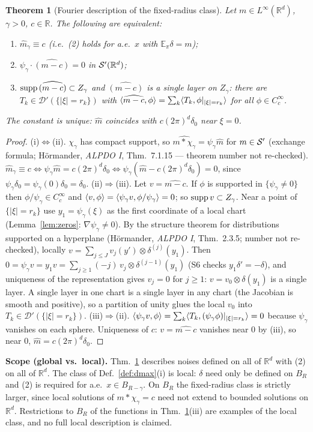 \documentclass[11pt,a4paper]{article}
\numberwithin{equation}{section}
\newtheorem{theorem}{Theorem}[section]
\theoremstyle{definition}
\theoremstyle{remark}
\newcommand{\E}{\mathbb E}\newcommand{\R}{\mathbb R}\newcommand{\N}{\mathbb N}\newcommand{\Prob}{\mathbb P}
\begin{document}
\begin{theorem}[Fourier description of the fixed-radius class]\label{thm:fourier}
Let $m\in L^\infty(\R^d)$, $\gamma>0$, $c\in\R$. The following are equivalent:
\begin{enumerate}[label=(\roman*)]
\item $\hat m_\gamma\equiv c$ (i.e.\ (2) holds for a.e.\ $x$ with $\E_\pi\delta=m$);
\item $\psi_\gamma\cdot\widehat{(m-c)}=0$ in $\cS'(\R^d)$;
\item $\operatorname{supp}\widehat{(m-c)}\subset Z_\gamma$ and $\widehat{(m-c)}$ is a single layer on $Z_\gamma$: there are $T_k\in\mathcal D'(\{|\xi|=r_k\})$ with $\langle \widehat{m-c},\phi\rangle=\sum_k\langle T_k,\phi|_{|\xi|=r_k}\rangle$ for all $\phi\in C_c^\infty$.
\end{enumerate}
The constant is unique: $\hat m$ coincides with $c(2\pi)^d\delta_0$ near $\xi=0$.
\end{theorem}
\begin{proof}
(i)$\iff$(ii). $\chi_\gamma$ has compact support, so $\widehat{m*\chi_\gamma}=\psi_\gamma\hat m$ for $m\in\mathcal S'$ (exchange formula; Hörmander, \emph{ALPDO I}, Thm.~7.1.15 --- theorem number not re-checked). $\hat m_\gamma\equiv c\iff\psi_\gamma\hat m=c(2\pi)^d\delta_0\iff\psi_\gamma(\hat m-c(2\pi)^d\delta_0)=0$, since $\psi_\gamma\delta_0=\psi_\gamma(0)\delta_0=\delta_0$.
(ii)$\Rightarrow$(iii). Let $v=\widehat{m-c}$. If $\phi$ is supported in $\{\psi_\gamma\ne0\}$ then $\phi/\psi_\gamma\in C_c^\infty$ and $\langle v,\phi\rangle=\langle \psi_\gamma v,\phi/\psi_\gamma\rangle=0$; so $\operatorname{supp} v\subset Z_\gamma$. Near a point of $\{|\xi|=r_k\}$ use $y_1=\psi_\gamma(\xi)$ as the first coordinate of a local chart (Lemma~\ref{lem:zeros}: $\nabla\psi_\gamma\ne0$). By the structure theorem for distributions supported on a hyperplane (Hörmander, \emph{ALPDO I}, Thm.~2.3.5; number not re-checked), locally $v=\sum_{j\le J}v_j(y')\otimes\delta^{(j)}(y_1)$. Then $0=\psi_\gamma v=y_1v=\sum_{j\ge1}(-j)\,v_j\otimes\delta^{(j-1)}(y_1)$ (S6 checks $y_1\delta'=-\delta$), and uniqueness of the representation gives $v_j=0$ for $j\ge1$: $v=v_0\otimes\delta(y_1)$ is a single layer. A single layer in one chart is a single layer in any chart (the Jacobian is smooth and positive), so a partition of unity glues the local $v_0$ into $T_k\in\mathcal D'(\{|\xi|=r_k\})$.
(iii)$\Rightarrow$(ii). $\langle \psi_\gamma v,\phi\rangle=\sum_k\langle T_k,(\psi_\gamma\phi)|_{|\xi|=r_k}\rangle=0$ because $\psi_\gamma$ vanishes on each sphere.
Uniqueness of $c$: $v=\widehat{m-c}$ vanishes near $0$ by (iii), so near $0$, $\hat m=c(2\pi)^d\delta_0$.
\end{proof}
\noindent\textbf{Scope (global vs.\ local).} Thm.~\ref{thm:fourier} describes noises defined on all of $\R^d$ with (2) on all of $\R^d$. The class of Def.~\ref{def:dmax}(i) is local: $\delta$ need only be defined on $B_R$ and (2) is required for a.e.\ $x\in B_{R-\gamma}$. On $B_R$ the fixed-radius class is strictly larger, since local solutions of $m*\chi_\gamma=c$ need not extend to bounded solutions on $\R^d$. Restrictions to $B_R$ of the functions in Thm.~\ref{thm:fourier}(iii) are examples of the local class, and no full local description is claimed.
\end{document}
